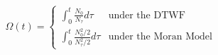 \documentclass[11pt, twocolumn]{article}
\begin{document}
\begin{equation}
	\Omega(t) = \begin{cases}
		\int_{0}^t \frac{N_0}{N_\tau} d\tau &\text{under the DTWF}\\[2ex]
		\int_{0}^t \frac{N_0^2/2}{N_\tau^2/2} d\tau  &\text{under the Moran Model}
	\end{cases}
\end{equation}








\end{document}

